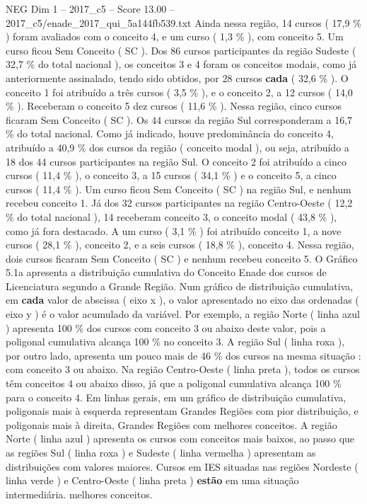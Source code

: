\begin{textsample}{NEG Dim 1 – 2017\_c5 – Score 13.00 – 2017\_c5/enade\_2017\_qui\_5a144fb539.txt}
Ainda nessa região, 14 cursos ( 17,9 \% ) foram avaliados com o conceito 4, e um curso ( 1,3 \% ), com conceito 5.
Um curso ficou Sem Conceito ( SC ).
Dos 86 cursos participantes da região Sudeste ( 32,7 \% do total nacional ), os conceitos 3 e 4 foram os conceitos modais, como já anteriormente assinalado, tendo sido obtidos, por 28 cursos \textbf{cada} ( 32,6 \% ).
O conceito 1 foi atribuído a três cursos ( 3,5 \% ), e o conceito 2, a 12 cursos ( 14,0 \% ).
Receberam o conceito 5 dez cursos ( 11,6 \% ).
Nessa região, cinco cursos ficaram Sem Conceito ( SC ).
Os 44 cursos da região Sul corresponderam a 16,7 \% do total nacional.
Como já indicado, houve predominância do conceito 4, atribuído a 40,9 \% dos cursos da região ( conceito modal ), ou seja, atribuído a 18 dos 44 cursos participantes na região Sul.
O conceito 2 foi atribuído a cinco cursos ( 11,4 \% ), o conceito 3, a 15 cursos ( 34,1 \% ) e o conceito 5, a cinco cursos ( 11,4 \% ).
Um curso ficou Sem Conceito ( SC ) na região Sul, e nenhum recebeu conceito 1.
Já dos 32 cursos participantes na região Centro-Oeste ( 12,2 \% do total nacional ), 14 receberam conceito 3, o conceito modal ( 43,8 \% ), como já fora destacado.
A um curso ( 3,1 \% ) foi atribuído conceito 1, a nove cursos ( 28,1 \% ), conceito 2, e a seis cursos ( 18,8 \% ), conceito 4.
Nessa região, dois cursos ficaram Sem Conceito ( SC ) e nenhum recebeu conceito 5.
O Gráfico 5.1a apresenta a distribuição cumulativa do Conceito Enade dos cursos de Licenciatura segundo a Grande Região.
Num gráfico de distribuição cumulativa, em \textbf{cada} valor de abscissa ( eixo x ), o valor apresentado no eixo das ordenadas ( eixo y ) é o valor acumulado da variável.
Por exemplo, a região Norte ( linha azul ) apresenta 100 \% dos cursos com conceito 3 ou abaixo deste valor, pois a poligonal cumulativa alcança 100 \% no conceito 3.
A região Sul ( linha roxa ), por outro lado, apresenta um pouco mais de 46 \% dos cursos na mesma situação : com conceito 3 ou abaixo.
Na região Centro-Oeste ( linha preta ), todos os cursos têm conceitos 4 ou abaixo disso, já que a poligonal cumulativa alcança 100 \% para o conceito 4.
Em linhas gerais, em um gráfico de distribuição cumulativa, poligonais mais à esquerda representam Grandes Regiões com pior distribuição, e poligonais mais à direita, Grandes Regiões com melhores conceitos.
A região Norte ( linha azul ) apresenta os cursos com conceitos mais baixos, ao passo que as regiões Sul ( linha roxa ) e Sudeste ( linha vermelha ) apresentam as distribuições com valores maiores.
Cursos em IES situadas nas regiões Nordeste ( linha verde ) e Centro-Oeste ( linha preta ) \textbf{estão} em uma situação intermediária. melhores conceitos.

\end{textsample}
